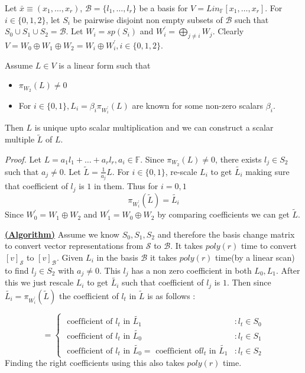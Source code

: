 \documentclass[letterpaper,USenglish,numberwithinsect]{lipics}
\newcommand{\F}{\mathbb{F}}
\newcommand{\MB}{\mathcal{B}}
\newcommand{\MS}{\mathcal{S}}
\newcommand{\B}[1]{\bar{#1}}
\begin{document}
Let $\B{x}\equiv (x_1,\ldots,x_r)$, $\MB = \{l_1,\ldots,l_r\}$ be a basis for $V=Lin_{\F}[x_1,\ldots,x_r]$. For $i\in
\{0,1,2\}$, let $S_i$ be pairwise disjoint non empty subsets of $\MB$
such that $S_0\cup S_1\cup S_2 = \MB$. Let $W_i=sp(S_i)$ and $W_i^\prime =
\bigoplus\limits_{j\neq i}W_j$. Clearly $V=W_0\oplus W_1\oplus W_2 = W_i\oplus
W_i^\prime, i\in \{0,1,2\} $.


\begin{lemma}\label{reconlin}
Assume $L\in V$ is a linear form such that
\begin{itemize}
\item $\pi_{W_2}(L) \neq 0$
\item  For $i\in \{0,1\}, L_i=\beta_i \pi_{W_i^\prime}(L)$ are known for some
non-zero scalars $\beta_i$.
\end{itemize}
Then $L$ is unique upto scalar multiplication and we can construct a scalar
multiple $\tilde{L}$ of $L$.
\end{lemma}
\emph{Proof.}
Let $L=a_1l_1 + \ldots + a_rl_r, a_i\in \F$. Since $\pi_{W_2}(L)\neq 0$, there
exists $l_j\in S_2$ such that $a_j\neq 0$. Let $\tilde{L} = \frac{1}{a_{j}}L$.
For $i\in \{0,1\}$, re-scale
$L_i $ to get $\tilde{L_i}$  making sure that coefficient of $l_j$ is $1$ in
them. Thus for $i=0,1$
 \[
 \pi_{W_i^\prime}(\tilde{L}) = \tilde{L_i}
 \]
 Since $W_0^\prime = W_1\oplus W_2$ and $W_1^\prime = W_0\oplus W_2$  by
comparing coefficients we can get $\tilde{L}$.


\underline{\bf (Algorithm)} \label{linformrecon} Assume we know $S_0,S_1,S_2$ and therefore the
basis change matrix to convert vector representations from $\MS$ to $\MB$. It takes $poly(r)$ time to
convert $[v]_{\MS}$ to $[v]_{\MB}$. Given $L_i$ in the basis $\MB$ it takes $poly(r)$
time(by a linear scan) to find $l_j\in S_2$ with $a_j\neq 0$. This $l_j$ has a
non zero coefficient in both $L_0,L_1$. After this we
just rescale $L_i$ to get $\tilde{L_i}$ such that coefficient of $l_j$ is $1$. Then since $\tilde{L_i} =
\pi_{W_i^\prime}(\tilde{L})$ the coefficient of $l_t$ in $\tilde{L}$ is as
follows :

\begin{displaymath}
   = \left\{
     \begin{array}{lr}
       \text{ coefficient of }l_t\text{ in } \tilde{L_1} & : l_t\in S_0\\
       \text{ coefficient of }l_t\text{ in } \tilde{L_0} & : l_t\in S_1\\
       \text{ coefficient of }l_t\text{ in } \tilde{L_0} = \text{ coefficient of
}l_t\text{ in } \tilde{L_1} & : l_t\in S_2
     \end{array}
   \right.
\end{displaymath}
Finding the right coefficients using this also takes $poly(r)$ time.\\
\end{document}
